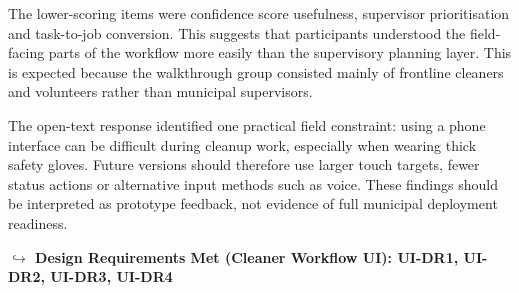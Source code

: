 The lower-scoring items were confidence score usefulness, supervisor prioritisation and task-to-job conversion. This suggests that participants understood the field-facing parts of the workflow more easily than the supervisory planning layer. This is expected because the walkthrough group consisted mainly of frontline cleaners and volunteers rather than municipal supervisors.

The open-text response identified one practical field constraint: using a phone interface can be difficult during cleanup work, especially when wearing thick safety gloves. Future versions should therefore use larger touch targets, fewer status actions or alternative input methods such as voice. These findings should be interpreted as prototype feedback, not evidence of full municipal deployment readiness.

\vspace{1em}
\noindent \textbf{$\hookrightarrow$ Design Requirements Met (Cleaner Workflow UI): UI-DR1, UI-DR2, UI-DR3, UI-DR4}
